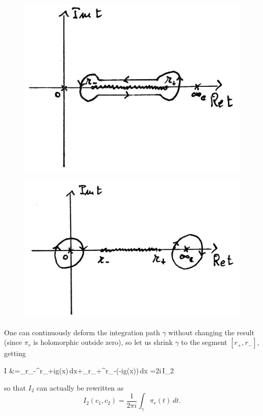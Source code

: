 \documentclass[main.tex]{subfiles}
\begin{document}
\begin{example}
	\begin{figure}[H]
	\centering
	\begin{minipage}{0.45\textwidth}
	\centering
	 \includegraphics[width=\textwidth]{figures/IntPath.jpeg}
	 \label{fig:IntPath}
	\end{minipage}
	\centering
	\begin{minipage}{0.5\textwidth}
	\centering
	 \includegraphics[width=\textwidth]{figures/ResidueIntPath.jpeg}
	 \label{fig:ResidueIntPath}
	\end{minipage}
	\end{figure}

	One can continuously deform the integration path $\gamma$ without changing the result
	(since $\pi_r$ is holomorphic outside zero), so let us shrink $\gamma$ to the segment $[r_+,r_-]$, getting
	\begin{eqalign}
		I &=\int_{r_-}^{r_+}ig(x)\,dx+\int_{r_+}^{r_-}(-ig(x))\,dx =2\pi i\,I_2
	\end{eqalign}
	so that $I_2$ can actually be rewritten as
	\begin{equation}
		I_2(c_1,c_2)= \frac{1}{2\pi i}\int_\gamma \pi_r(t)\,dt.
	\end{equation}


\end{example}
\end{document}
